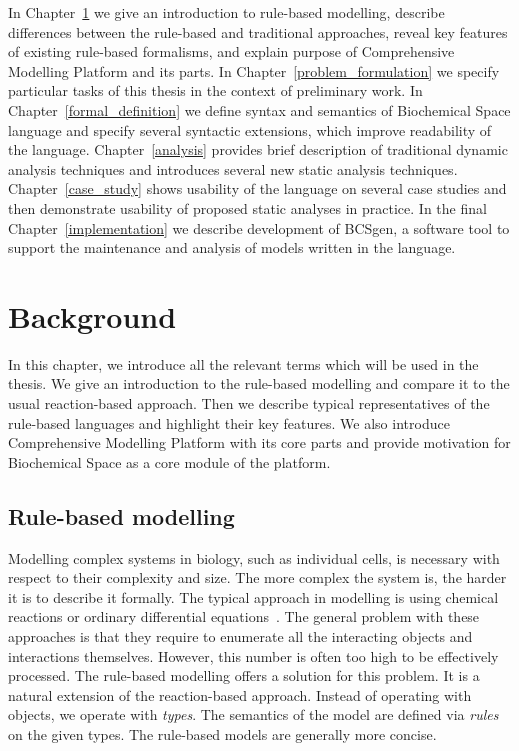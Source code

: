 \documentclass[12pt, twoside]{fithesis2} %
\begin{document}
In Chapter~\ref{background} we give an introduction to rule-based modelling, describe differences between the rule-based and traditional approaches, reveal key features of existing rule-based formalisms, and explain purpose of Comprehensive Modelling Platform and its parts. In Chapter~\ref{problem_formulation} we specify particular tasks of this thesis in the context of preliminary work. In Chapter~\ref{formal_definition} we define syntax and semantics of Biochemical Space language and specify several syntactic extensions, which improve readability of the language. Chapter~\ref{analysis} provides brief description of traditional dynamic analysis techniques and introduces several new static analysis techniques. Chapter~\ref{case_study} shows usability of the language on several case studies and then demonstrate usability of proposed static analyses in practice. In the final Chapter~\ref{implementation} we describe development of BCSgen, a software tool to support the maintenance and analysis of models written in the language. 

\chapter{Background}
\label{background}

In this chapter, we introduce all the relevant terms which will be used in the thesis. We give an introduction to the rule-based modelling and compare it to the usual reaction-based approach. Then we describe typical representatives of the rule-based languages and highlight their key features. We also introduce Comprehensive Modelling Platform with its core parts and provide motivation for Biochemical Space as a core module of the platform.

\section{Rule-based modelling}
\label{Rule-based basics}

Modelling complex systems in biology, such as individual cells, is necessary with respect to their complexity and size. The more complex the system is, the harder it is to describe it formally. The typical approach in modelling is using chemical reactions or ordinary differential equations~\cite{coddington1955theory}. The general problem with these approaches is that they require to enumerate all the interacting objects and interactions themselves. However, this number is often too high to be effectively processed. The rule-based modelling offers a solution for this problem. It is a natural extension of the reaction-based approach. Instead of operating with objects, we operate with \emph{types}. The semantics of the model are defined via \emph{rules} on the given types. The rule-based models are generally more concise.
\end{document}
